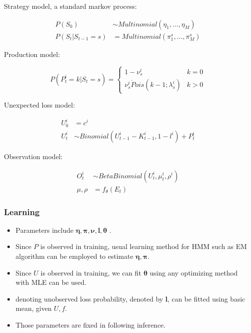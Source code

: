 \documentclass{beamer}
\begin{document}
\begin{frame}

Strategy model, a standard markov process:

\begin{align*}
P(S_0) &\sim Multinomial(\eta_1,\dots,\eta_M) \\
P(S_t|S_{t-1} = s) &= Multinomial(\pi_1^s,\dots,\pi_M^s)
\end{align*}

Production model:

$$
P(P_t^i = k|S_t=s)=\begin{cases}
    1 - \nu_s^i & k=0 \\
    \nu_s^i \dot Pois(k-1;\lambda_s^i) & k>0
\end{cases}
$$

Unexpected loss model:

\begin{align*}
    U_0^i &= c^i \\
    U_t^i &\sim Binomial(U_{t-1}^i - K_{t-1}^i, 1-l^i) + P_t^i
\end{align*}

Observation model:

\begin{align*}
    O_t^i &\sim BetaBinomial(U_t^i,\mu_t^i,\rho^i) \\
    \mu, \rho &= f_\theta(E_t)
\end{align*}    

\end{frame}

\begin{frame}
    \frametitle{Learning}

    \begin{itemize}

    \item Parameters include $\mathbf{\eta}, \mathbf{\pi}, \mathbf{\nu}, \mathbf{l}, \mathbf{\theta}$ .
    \item Since $P$ is observed in training, usual learning method for HMM such as EM algorithm
     can be employed to estimate $\mathbf{\eta}, \mathbf{\pi}$.
    \item Since $U$ is observed in training, we can fit $\mathbf{\theta}$ using any optimizing method with MLE can be used.
    \item denoting unobserved loss probability, denoted by $\mathbf{l}$, can be fitted using basic mean, given $U,f$.
    \item Those parameters are fixed in following inference.
    \end{itemize}
\end{frame}
\end{document}
